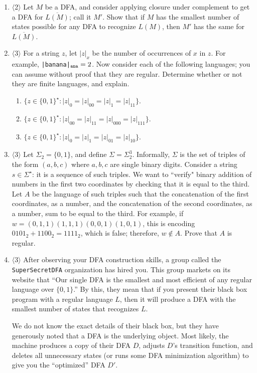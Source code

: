 \documentclass[a4paper,american,12pt]{book}
\newcommand{\Level}[1]{{\color{blue} $\langle$#1$\rangle$}}
\begin{document}
\begin{enumerate}
\item \Level{2} Let $M$ be a DFA, and consider applying closure under complement to get a DFA for $\overline{L(M)}$; call it $M'$. 
Show that if $M$ has the smallest number of states possible for any DFA to recognize $L(M)$, then $M'$ has the same for $\overline{L(M)}$.

\item \Level{3} For a string $z$, let $|z|_x$ be the number of occurrences of $x$ in $z$.
For example, {\tt |banana|}$_{\tt ana} = 2$. 
Now consider each of the following languages; you can assume without proof that they are regular.
Determine whether or not they are finite languages, and explain.
\begin{enumerate}
	\item $\{z \in \{0,1\}^\star : |z|_0 = |z|_{00} = |z|_{1} = |z|_{11}\}$.
	\item $\{z \in \{0,1\}^\star : |z|_{00} = |z|_{11} = |z|_{000} = |z|_{111}\}$.
	\item $\{z \in \{0,1\}^\star : |z|_0 = |z|_{1} = |z|_{01} = |z|_{10}\}$.
\end{enumerate}

\item \Level{3} Let $\Sigma_{2} = \{0, 1\}$, and define $\Sigma = \Sigma_{2}^3$. Informally, $\Sigma$ is the set of triples of the form $(a, b, c)$ where $a, b, c$ are single binary digits. Consider a string $s \in \Sigma^\star$: it is a sequence of such triples. We want to ``verify" binary addition of numbers in the first two coordinates by checking that it is equal to the third. Let $A$ be the language of such triples such that the concatenation of the first coordinates, as a number, and the concatenation of the second coordinates, as a number, sum to be equal to the third. For example, if $w = (0, 1, 1)(1,1,1)(0,0,1)(1,0,1)$, this is encoding $0101_2 + 1100_2 = 1111_2$, which is false; therefore, $w \notin A$. Prove that $A$ is regular.

\item \Level{3} After observing your DFA construction skills, a group called the {\tt SuperSecretDFA} organization has hired you. This group markets on its website that ``Our single DFA is the smallest and most efficient of any regular language over $\{0,1\}$.''
By this, they mean that if you present their black box program with a regular language $L$, then it will produce a DFA with the smallest number of states that recognizes $L$.

We do not know the exact details of their black box, but they have generously noted that a DFA is the underlying object.
Most likely, the machine produces a copy of their DFA $D$, adjusts $D$'s transition function, and deletes all unnecessary states (or runs some DFA minimization algorithm) to give you the ``optimized'' DFA $D'$.


\end{enumerate}
\end{document}
